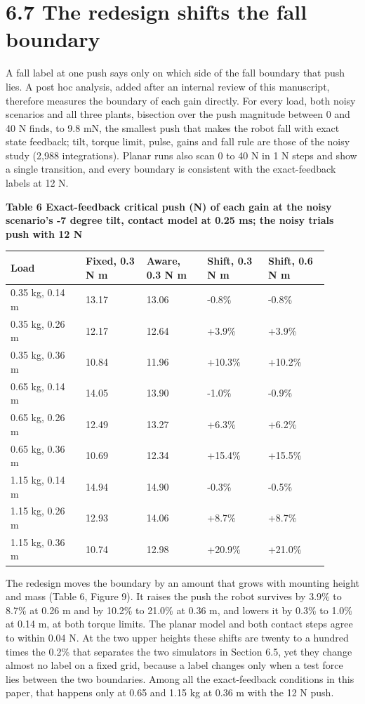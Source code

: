 \documentclass[11pt,a4paper]{article}
\begin{document}
\section*{6.7 The redesign shifts the fall boundary}
A fall label at one push says only on which side of the fall boundary that push lies. A post hoc analysis, added after an internal review of this manuscript, therefore measures the boundary of each gain directly. For every load, both noisy scenarios and all three plants, bisection over the push magnitude between 0 and 40 N finds, to 9.8 mN, the smallest push that makes the robot fall with exact state feedback; tilt, torque limit, pulse, gains and fall rule are those of the noisy study (2,988 integrations). Planar runs also scan 0 to 40 N in 1 N steps and show a single transition, and every boundary is consistent with the exact-feedback labels at 12 N.

\textbf{Table 6 Exact-feedback critical push (N) of each gain at the noisy scenario's -7 degree tilt, contact model at 0.25 ms; the noisy trials push with 12 N}
\begin{longtable}{p{0.216\linewidth}p{0.171\linewidth}p{0.171\linewidth}p{0.171\linewidth}p{0.171\linewidth}}
\toprule
Load & Fixed, 0.3 N m & Aware, 0.3 N m & Shift, 0.3 N m & Shift, 0.6 N m \\ \midrule \endhead
0.35 kg, 0.14 m & 13.17 & 13.06 & -0.8\% & -0.8\% \\
0.35 kg, 0.26 m & 12.17 & 12.64 & +3.9\% & +3.9\% \\
0.35 kg, 0.36 m & 10.84 & 11.96 & +10.3\% & +10.2\% \\
0.65 kg, 0.14 m & 14.05 & 13.90 & -1.0\% & -0.9\% \\
0.65 kg, 0.26 m & 12.49 & 13.27 & +6.3\% & +6.2\% \\
0.65 kg, 0.36 m & 10.69 & 12.34 & +15.4\% & +15.5\% \\
1.15 kg, 0.14 m & 14.94 & 14.90 & -0.3\% & -0.5\% \\
1.15 kg, 0.26 m & 12.93 & 14.06 & +8.7\% & +8.7\% \\
1.15 kg, 0.36 m & 10.74 & 12.98 & +20.9\% & +21.0\% \\
\bottomrule
\end{longtable}
The redesign moves the boundary by an amount that grows with mounting height and mass (Table 6, Figure 9). It raises the push the robot survives by 3.9\% to 8.7\% at 0.26 m and by 10.2\% to 21.0\% at 0.36 m, and lowers it by 0.3\% to 1.0\% at 0.14 m, at both torque limits. The planar model and both contact steps agree to within 0.04 N. At the two upper heights these shifts are twenty to a hundred times the 0.2\% that separates the two simulators in Section 6.5, yet they change almost no label on a fixed grid, because a label changes only when a test force lies between the two boundaries. Among all the exact-feedback conditions in this paper, that happens only at 0.65 and 1.15 kg at 0.36 m with the 12 N push.
\end{document}
